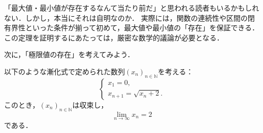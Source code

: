 \documentclass[a4paper,11pt]{ltjsarticle}
\begin{document}
「最大値・最小値が存在するなんて当たり前だ」と思われる読者もいるかもしれない．しかし，本当にそれは自明なのか．
実際には，関数の連続性や区間の閉有界性といった条件が揃って初めて，最大値や最小値の「存在」を保証できる．この定理を証明するにあたっては，厳密な数学的議論が必要となる．

次に，「極限値の存在」を考えてみよう．

\begin{prop}{}{}
以下のような漸化式で定められた数列$(x_n)_{n \in \mathbb{N}}$を考える：
\[
\begin{cases}
x_1 =0 ,\\
x_{n+1}= \sqrt{x_n+2}.
\end{cases}
\]
このとき，$(x_n)_{n \in \mathbb{N}}$は収束し，
\[
\lim_{n \to \infty} x_n =2
\]
である．
\end{prop}
\end{document}
